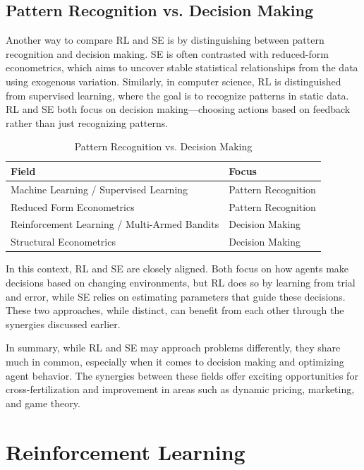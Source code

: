 \subsection{Pattern Recognition vs. Decision Making}

Another way to compare RL and SE is by distinguishing between pattern recognition and decision making. SE is often contrasted with reduced-form econometrics, which aims to uncover stable statistical relationships from the data using exogenous variation. Similarly, in computer science, RL is distinguished from supervised learning, where the goal is to recognize patterns in static data. RL and SE both focus on decision making—choosing actions based on feedback rather than just recognizing patterns.

\begin{table}[h!]
\centering
\caption{Pattern Recognition vs. Decision Making}
\begin{tabular}{|l|l|}
\hline
\textbf{Field} & \textbf{Focus} \\
\hline
Machine Learning / Supervised Learning & Pattern Recognition \\
Reduced Form Econometrics & Pattern Recognition \\
Reinforcement Learning / Multi-Armed Bandits & Decision Making \\
Structural Econometrics & Decision Making \\
\hline
\end{tabular}
\end{table}

In this context, RL and SE are closely aligned. Both focus on how agents make decisions based on changing environments, but RL does so by learning from trial and error, while SE relies on estimating parameters that guide these decisions. These two approaches, while distinct, can benefit from each other through the synergies discussed earlier.

In summary, while RL and SE may approach problems differently, they share much in common, especially when it comes to decision making and optimizing agent behavior. The synergies between these fields offer exciting opportunities for cross-fertilization and improvement in areas such as dynamic pricing, marketing, and game theory.

\section{Reinforcement Learning \label{sec:results}}

